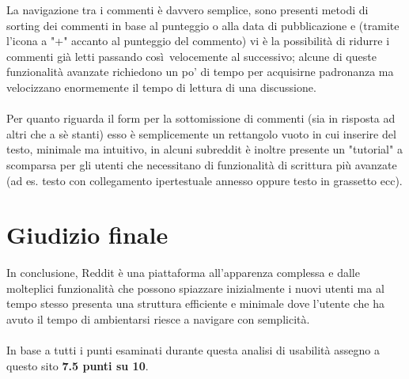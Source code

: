 \documentclass[12pt]{article}
\begin{document}
La navigazione tra i commenti \`e davvero semplice, sono presenti metodi di sorting dei commenti in base al punteggio o alla data di pubblicazione e (tramite l'icona a "+" accanto al punteggio del commento) vi \`e la possibilit\`a di ridurre i commenti gi\`a letti passando cos\`i\ velocemente al successivo; alcune di queste funzionalit\`a avanzate richiedono un po' di tempo per acquisirne padronanza ma velocizzano enormemente il tempo di lettura di una discussione. \\ \\
Per quanto riguarda il form per la sottomissione di commenti (sia in risposta ad altri che a s\`e stanti) esso \`e semplicemente un rettangolo vuoto in cui inserire del testo, minimale ma intuitivo, in alcuni subreddit \`e inoltre presente un "tutorial" a scomparsa  per gli utenti che necessitano di funzionalit\`a  di scrittura pi\`u avanzate (ad es. testo con collegamento ipertestuale annesso oppure testo in grassetto ecc).

\section{Giudizio finale}
In conclusione, Reddit \`e una piattaforma all'apparenza complessa e dalle molteplici funzionalit\`a che possono spiazzare inizialmente i nuovi utenti ma al tempo stesso presenta una struttura efficiente e minimale dove l'utente che ha avuto il tempo di ambientarsi riesce a navigare con semplicit\`a.\\ \\ In base a tutti i punti esaminati durante questa analisi di usabilit\`a assegno a questo sito \textbf{7.5 punti su 10}.
\end{document}
